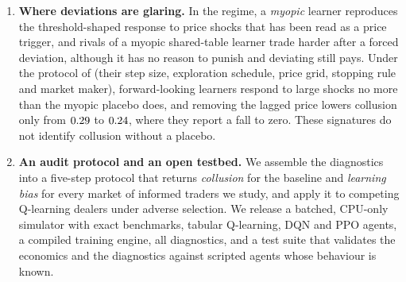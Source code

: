 \begin{enumerate}
  between competition and the cartel, yet rivals never punish deviations,
  even with perfect monitoring, and deviating pays. The myopic placebo trades
  even less ($\Delta=\MyopicResidDeltaInt$, beyond the cartel); an uninformative
  memory reproduces the outcome ($\RandomMemDeltaInt$); and when passive
  traders put the cartel \emph{above} Nash, learners still trade half their
  Nash intensity and earn \PassiveProfitPct\% less than in equilibrium.
  Blurring the order flow changes nothing ($\Delta=\OpaqueDeltaInt$), while
  counterfactual updating, a change to the learning rule alone, restores
  competition ($\Delta=\CfResidDeltaInt$).
\item \textbf{Where deviations are glaring.} In the \citet{dou2025} regime, a
  \emph{myopic} learner reproduces the threshold-shaped response to price
  shocks that has been read as a price trigger, and rivals of a myopic
  shared-table learner trade harder after a forced deviation, although it has
  no reason to punish and deviating still pays. Under the protocol of
  \citet{dou2025} (their step size, exploration schedule, price grid,
  stopping rule and market maker), forward-looking learners respond to large shocks
  no more than the myopic placebo does, and removing the lagged price lowers
  collusion only from $0.29$ to $0.24$, where they
  report a fall to zero. These signatures do not identify collusion without
  a placebo.
\item \textbf{An audit protocol and an open testbed.} We assemble the
  diagnostics into a five-step protocol that returns \emph{collusion} for the
  \citet{calvano2020} baseline and \emph{learning bias} for every market of
  informed traders we study, and apply it to competing Q-learning dealers
  under adverse selection. We release a batched, CPU-only simulator with
  exact benchmarks, tabular Q-learning, DQN and PPO agents, a compiled
  training engine, all diagnostics, and a test suite that validates the
  economics and the diagnostics against scripted agents whose behaviour is
  known.
\end{enumerate}
